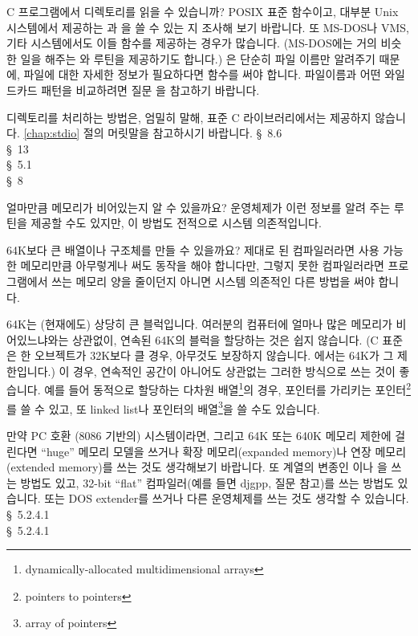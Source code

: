 \begin{faq}
	C 프로그램에서 디렉토리를 읽을 수 있습니까?
\A
	POSIX 표준 함수이고, 대부분 Unix 시스템에서 제공하는 과
	을 쓸 수 있는 지 조사해 보기 바랍니다.
	또 MS-DOS나 VMS, 기타 시스템에서도 이들 함수를 제공하는 경우가
	많습니다.  (MS-DOS에는 거의 비슷한 일을 해주는 와
	 루틴을 제공하기도 합니다.)
	은 단순히 파일 이름만 알려주기 때문에, 파일에 대한
	자세한 정보가 필요하다면  함수를 써야 합니다.
	파일이름과 어떤 와일드카드 패턴을 비교하려면 질문 을
	참고하기 바랍니다.

\T
	디렉토리를 처리하는 방법은, 엄밀히 말해, 표준 C 라이브러리에서는
	제공하지 않습니다.  \ref{chap:stdio} 절의 머릿말을 참고하시기 바랍니다.
\R
	\cite{kr2} \S\ 8.6  \\
	\cite{pcs} \S\ 13  \\
	\cite{posix} \S\ 5.1 \\
	\cite{swsolution} \S\ 8
\end{faq}

\begin{faq}
	얼마만큼 메모리가 비어있는지 알 수 있을까요?
\A
	운영체제가 이런 정보를 알려 주는 루틴을 제공할 수도 있지만,
	이 방법도 전적으로 시스템 의존적입니다.
\end{faq}

\begin{faq}
	64K보다 큰 배열이나 구조체를 만들 수 있을까요?
\A
	제대로 된 컴파일러라면 사용 가능한 메모리만큼 아무렇게나
	써도 동작을 해야 합니다만, 그렇지 못한 컴파일러라면
	프로그램에서 쓰는 메모리 양을 줄이던지 아니면 시스템 의존적인
	다른 방법을 써야 합니다.

	64K는 (현재에도) 상당히 큰 블럭입니다.  여러분의 컴퓨터에 얼마나
	많은 메모리가 비어있느냐와는 상관없이, 연속된 64K의 블럭을 할당하는
	것은 쉽지 않습니다.
	(C 표준은 한 오브젝트가 32K보다 클 경우, 아무것도 보장하지 않습니다.
	\cite{c9x}에서는 64K가 그 제한입니다.)
	이 경우, 연속적인 공간이 아니어도 상관없는 그러한 방식으로 쓰는 것이
	좋습니다.  예를 들어 동적으로 할당하는 다차원
	배열\footnote{dynamically-allocated multidimensional arrays}의 경우,
	포인터를 가리키는 포인터\footnote{pointers to pointers}를 쓸 수 있고,
	또 linked list나 포인터의 배열\footnote{array of pointers}을
	쓸 수도 있습니다.

	만약 PC 호환 (8086 기반의) 시스템이라면, 그리고
	64K 또는 640K 메모리 제한에 걸린다면 ``huge'' 메모리 모델을 쓰거나
	확장 메모리(expanded memory)나 연장 메모리(extended memory)를
	쓰는 것도 생각해보기 바랍니다.
	또  계열의 변종인 이나 을
	쓰는 방법도 있고, 32-bit ``flat'' 컴파일러(예를 들면 djgpp,
	질문  참고)를 쓰는 방법도 있습니다.
	또는 DOS extender를 쓰거나 다른 운영체제를 쓰는 것도 생각할 수
	있습니다.
\R
	\cite{c89} \S\ 5.2.4.1 \\
	\cite{c9x} \S\ 5.2.4.1
\end{faq}

